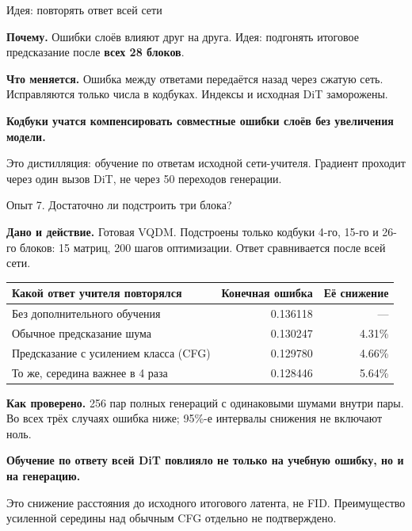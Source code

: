 \documentclass[aspectratio=1610,11pt]{beamer}
\renewcommand{\fact}[2]{\par\textcolor{Accent}{\textbf{#1.}} #2\par}
\newcommand{\finding}[1]{\par\vspace{.5mm}\textbf{#1}\par}
\newcommand{\detail}[1]{{\fontsize{10}{12}\selectfont #1\par}}
\newenvironment{datatable}{\par\begingroup\fontsize{10.5}{12.5}\selectfont\setlength{\tabcolsep}{4pt}\renewcommand{\arraystretch}{1.2}}{\par\endgroup}
\begin{document}
\begin{frame}[t]{Идея: повторять ответ всей сети}
  \fact{Почему}{Ошибки слоёв влияют друг на друга. Идея: подгонять
  итоговое предсказание после \textbf{всех 28 блоков}.}
  \begin{center}
  \end{center}
  \fact{Что меняется}{Ошибка между ответами передаётся назад через сжатую сеть.
  Исправляются только числа в кодбуках. Индексы и исходная DiT заморожены.}
  \finding{Кодбуки учатся компенсировать совместные ошибки слоёв без увеличения модели.}
  \detail{Это дистилляция: обучение по ответам исходной сети-учителя.
  Градиент проходит через один вызов DiT, не через 50 переходов генерации.}
\end{frame}

\begin{frame}[t]{Опыт 7. Достаточно ли подстроить три блока?}
  \fact{Дано и действие}{Готовая VQDM. Подстроены только кодбуки 4-го, 15-го и 26-го
  блоков: 15 матриц, 200 шагов оптимизации. Ответ сравнивается после всей сети.}
  \begin{datatable}
    \begin{tabular*}{\textwidth}{@{\extracolsep{\fill}}lrr@{}}
      \toprule
      Какой ответ учителя повторялся & Конечная ошибка & Её снижение\\
      \midrule
      Без дополнительного обучения & 0.136118 & ---\\
      Обычное предсказание шума & 0.130247 & 4.31\%\\
      Предсказание с усилением класса (CFG) & 0.129780 & 4.66\%\\
      То же, середина важнее в 4 раза & 0.128446 & 5.64\%\\
      \bottomrule
    \end{tabular*}
  \end{datatable}
  \fact{Как проверено}{256 пар полных генераций с одинаковыми шумами внутри пары.
  Во всех трёх случаях ошибка ниже; 95\%-е интервалы снижения не включают ноль.}
  \finding{Обучение по ответу всей DiT повлияло не только на учебную ошибку, но и на генерацию.}
  \detail{Это снижение расстояния до исходного итогового латента, не FID.
  Преимущество усиленной середины над обычным CFG отдельно не подтверждено.}
\end{frame}
\end{document}
